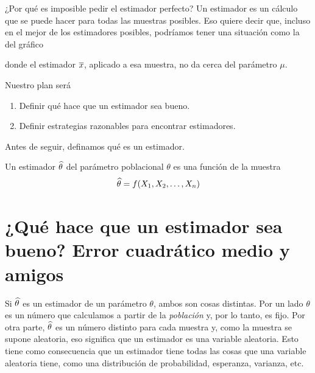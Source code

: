 ¿Por qué es imposible pedir el estimador perfecto? Un estimador es un cálculo que se puede hacer para todas las muestras posibles. Eso quiere decir que, incluso en el mejor de los estimadores posibles, podríamos tener una situación como la del gráfico\\
donde el estimador \(\overline{x}\), aplicado a esa muestra, no da cerca del parámetro \(\mu\).

Nuestro plan será
\begin{enumerate}
\item Definir qué hace que un estimador sea bueno.
\item Definir estrategias razonables para encontrar estimadores.
\end{enumerate}

Antes de seguir, definamos qué es un estimador.

\begin{definition}

Un estimador \(\widehat{\theta}\) del parámetro poblacional \(\theta\) es una función de la muestra \[\widehat{\theta} = f(X_1, X_2,\ldots, X_n)\]

\end{definition}

\section{¿Qué hace que un estimador sea bueno? Error cuadrático medio y amigos}

Si \(\widehat{\theta}\) es un estimador de un parámetro \(\theta\), ambos son cosas distintas. Por un lado \(\theta\) es un número que calculamos a partir de la \emph{población} y, por lo tanto, es fijo. Por otra parte, \(\widehat{\theta}\) es un número distinto para cada muestra y, como la muestra se supone aleatoria, eso significa que un estimador es una variable aleatoria. Esto tiene como consecuencia que un estimador tiene todas las cosas que una variable aleatoria tiene, como una distribución de probabilidad, esperanza, varianza, etc.

